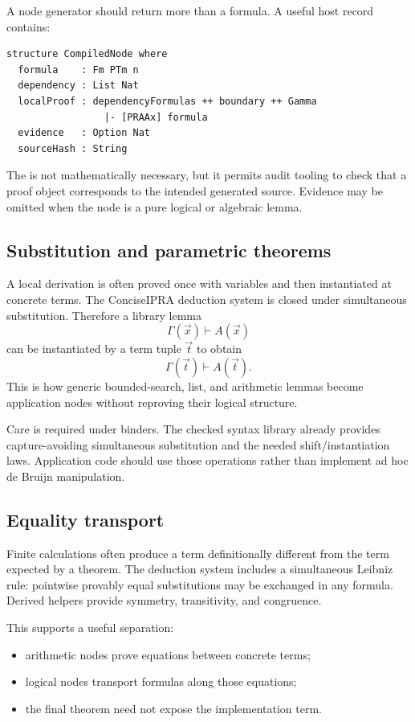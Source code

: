 A node generator should return more than a formula.  A useful host record contains:

\begin{lstlisting}
structure CompiledNode where
  formula    : Fm PTm n
  dependency : List Nat
  localProof : dependencyFormulas ++ boundary ++ Gamma
                 |- [PRAAx] formula
  evidence   : Option Nat
  sourceHash : String
\end{lstlisting}

The  is not mathematically necessary, but it permits audit tooling to check that a proof object corresponds to the intended generated source.  Evidence may be omitted when the node is a pure logical or algebraic lemma.

\subsection{Substitution and parametric theorems}

A local derivation is often proved once with variables and then instantiated at concrete terms.  The ConciseIPRA deduction system is closed under simultaneous substitution.  Therefore a library lemma
\[
 \Gamma(\vec x)\vdash A(\vec x)
\]
can be instantiated by a term tuple \(\vec t\) to obtain
\[
 \Gamma(\vec t)\vdash A(\vec t).
\]
This is how generic bounded-search, list, and arithmetic lemmas become application nodes without reproving their logical structure.

Care is required under binders.  The checked syntax library already provides capture-avoiding simultaneous substitution and the needed shift/instantiation laws.  Application code should use those operations rather than implement ad hoc de Bruijn manipulation.

\subsection{Equality transport}

Finite calculations often produce a term definitionally different from the term expected by a theorem.  The deduction system includes a simultaneous Leibniz rule: pointwise provably equal substitutions may be exchanged in any formula.  Derived helpers provide symmetry, transitivity, and congruence.

This supports a useful separation:

\begin{itemize}
\item arithmetic nodes prove equations between concrete terms;
\item logical nodes transport formulas along those equations;
\item the final theorem need not expose the implementation term.
\end{itemize}


